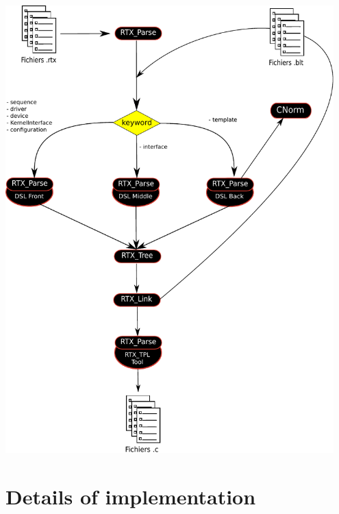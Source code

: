\documentclass{rtxreport}
\begin{document}
\includegraphics[width=0.95\textwidth]{logigramme.pdf}




\chapter{Details of implementation}
\end{document}
